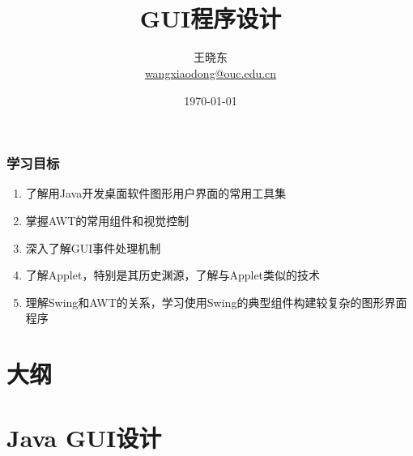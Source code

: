 
\title[KevinW@OUC]{\\  
  GUI程序设计}
\author[王晓东]{王晓东\\
  \href{mailto:wangxiaodong@ouc.edu.cn}{\footnotesize wangxiaodong@ouc.edu.cn}}
\date{\today}


\frame{\titlepage}
\begin{frame}
  \frametitle{学习目标}
  \begin{enumerate}
  \item 了解用Java开发桌面软件图形用户界面的常用工具集
  \item 掌握AWT的常用组件和视觉控制
  \item 深入了解GUI事件处理机制
  \item 了解Applet，特别是其历史渊源，了解与Applet类似的技术
  \item 理解Swing和AWT的关系，学习使用Swing的典型组件构建较复杂的图形界面程序
  \end{enumerate}  
\end{frame}

\section*{大纲}

\section{Java GUI设计}

